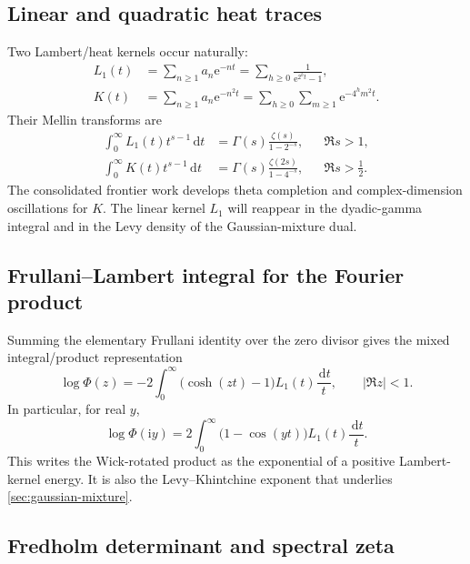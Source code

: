 \documentclass[11pt,oneside]{article}
\theoremstyle{definition}
\theoremstyle{remark}
\newcommand{\e}{\mathrm e}
\newcommand{\ii}{\mathrm i}
\newcommand{\dd}{\,\mathrm d}
\begin{document}
\subsection{Linear and quadratic heat traces}

Two Lambert/heat kernels occur naturally:
\begin{align}
 L_1(t)&=\sum_{n\ge1}a_n\e^{-nt}
       =\sum_{h\ge0}\frac{1}{\e^{2^ht}-1},               \label{eq:L1}\\
 K(t)&=\sum_{n\ge1}a_n\e^{-n^2t}
       =\sum_{h\ge0}\sum_{m\ge1}\e^{-4^hm^2t}.          \label{eq:Kheat}
\end{align}
Their Mellin transforms are
\begin{align}
 \int_0^\infty L_1(t)t^{s-1}\dd t
 &=\Gamma(s)\frac{\zeta(s)}{1-2^{-s}},&&\Re s>1,
                                                               \label{eq:L1-Mellin}\\
 \int_0^\infty K(t)t^{s-1}\dd t
 &=\Gamma(s)\frac{\zeta(2s)}{1-4^{-s}},&&\Re s>\tfrac12.
                                                               \label{eq:K-Mellin}
\end{align}
The consolidated frontier work develops theta completion and complex-dimension oscillations
for $K$.  The linear kernel $L_1$ will reappear in the dyadic-gamma integral and in the Levy
density of the Gaussian-mixture dual.

\subsection{Frullani--Lambert integral for the Fourier product}

Summing the elementary Frullani identity over the zero divisor gives the mixed
integral/product representation
\begin{equation}
 \boxed{\quad
 \log\Phi(z)
 =-2\int_0^\infty\bigl(\cosh(zt)-1\bigr)L_1(t)\frac{\dd t}{t},
 \qquad |\Re z|<1.
 \quad}                                                  \label{eq:Frullani-Phi}
\end{equation}
In particular, for real $y$,
\begin{equation}
 \log\Phi(\ii y)
 =2\int_0^\infty\bigl(1-\cos(yt)\bigr)L_1(t)\frac{\dd t}{t}.  \label{eq:Phi-imag-integral}
\end{equation}
This writes the Wick-rotated product as the exponential of a positive Lambert-kernel energy.
It is also the Levy--Khintchine exponent that underlies \cref{sec:gaussian-mixture}.

\subsection{Fredholm determinant and spectral zeta}
\end{document}
